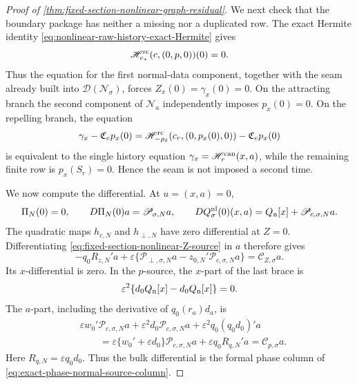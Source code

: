 \begin{proof}[Proof of
\cref{thm:fixed-section-nonlinear-graph-residual}]
We next check that the boundary package has neither a missing nor a
duplicated row.  The exact Hermite identity
\cref{eq:nonlinear-raw-history-exact-Hermite} gives
\[
 \mathscr H_{e_*}^{\rm rc}(c,(0,p,0))(0)=0.
\]
Thus the equation for the first normal-data component, together with the
seam already built into \(\mathcal D(\mathscr N_\sigma)\), forces
\(Z_x(0)=\gamma_x(0)=0\).  On the attracting branch the second component
of \(\mathscr N_a\) independently imposes \(p_x(0)=0\).  On the repelling
branch, the equation
\[
 \gamma_x-\mathfrak C_ep_x(0)
 =\mathscr H_{-\rho_\delta}^{\rm rc}
       (c_r,(0,p_x(0),0))-\mathfrak C_ep_x(0)
\]
is equivalent to the single history equation
\(\gamma_x=\mathscr H_r^{\rm can}(x,a)\), while the remaining finite row
is \(p_x(S_r)=0\).  Hence the seam is not imposed a second time.

We now compute the differential.  At \(u=(x,a)=0\),
\begin{equation}
\begin{gathered}
 \Pi_N(0)=0,\qquad
 D\Pi_N(0)a=\mathscr P_{\sigma,N}a,\qquad
 DQ_\sigma^{\rm nl}(0)(x,a)
 =Q_{\rm n}[x]+\mathscr P_{c,\sigma,N}a.
\end{gathered}                                    \label{eq:proof-fixed-section-speed-linearization}
\end{equation}
The quadratic maps \(h_{c,N}\) and \(h_{\perp,N}\) have zero differential
at \(Z=0\).  Differentiating
\cref{eq:fixed-section-nonlinear-Z-source} in \(a\) therefore gives
\[
 -q_0R_{z,N}'a
 +\varepsilon\{\mathscr P_{\perp,\sigma,N}a
       -z_{0,N}'\mathscr P_{c,\sigma,N}a\}
 =\mathscr C_{Z,\sigma}a.
\]
Its \(x\)-differential is zero.  In the \(p\)-source, the \(x\)-part of
the last brace is
\[
 \varepsilon^2\{d_0Q_{\rm n}[x]-d_0Q_{\rm n}[x]\}=0.
\]
The \(a\)-part, including the derivative of \(q_0(r_a)d_a\), is
\begin{align*}
 &\varepsilon w_0'\mathscr P_{c,\sigma,N}a
 +\varepsilon^2d_0\mathscr P_{c,\sigma,N}a
 +\varepsilon^2q_0(q_0d_0)'a\\
 &\qquad=\varepsilon\{w_0'+\varepsilon d_0\}
       \mathscr P_{c,\sigma,N}a
       +\varepsilon q_0R_{q,N}'a
 =\mathscr C_{p,\sigma}a.
\end{align*}
Here \(R_{q,N}=\varepsilon q_0d_0\).  Thus the bulk differential is the
formal phase column of
\cref{eq:exact-phase-normal-source-column}.


\end{proof}

